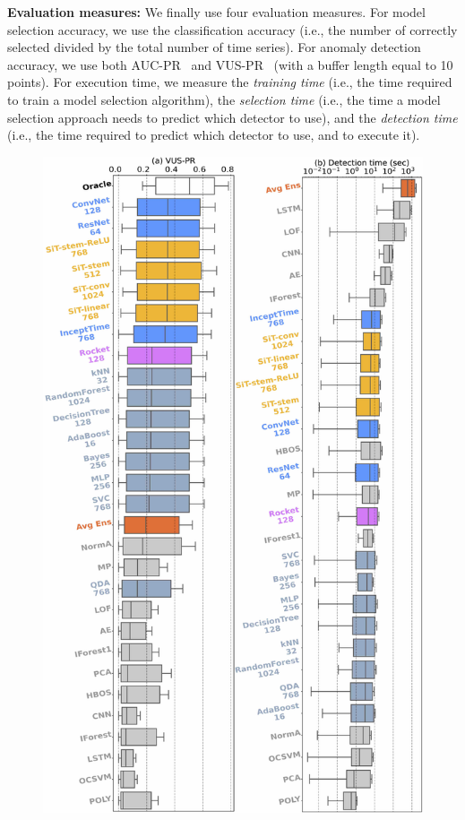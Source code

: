 \noindent \textbf{Evaluation measures: }
We finally use four evaluation measures. %
For model selection accuracy, we use the classification accuracy (i.e., the number of  correctly selected divided by the total number of time series). For anomaly detection accuracy, we use both AUC-PR~\cite{10.1145/1143844.1143874} and VUS-PR~\cite{10.14778/3551793.3551830} (with a buffer length equal to 10 points). For execution time, we measure the {\it training time} (i.e., the time required to train a model selection algorithm), the {\it selection time} (i.e., the time a model selection approach needs to predict which detector to use), and the {\it detection time} (i.e., the time required to predict which detector to use, and to execute it).

\begin{figure}
    \centering
    \includegraphics[width=0.90\linewidth]{figures/5_overall_results.jpg}

\end{figure}

